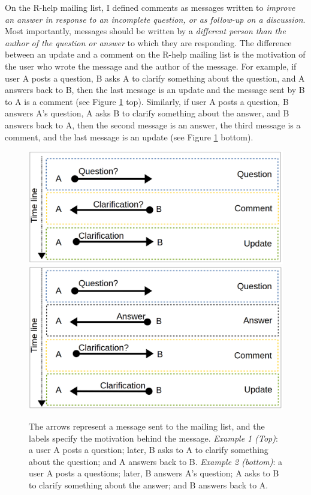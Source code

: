 \documentclass{sig-alternate-05-2015}
\begin{document}
	On the R-help mailing list, I defined comments as messages written to \emph{improve an answer in response to an incomplete question, or as follow-up on a discussion}.
	Most importantly, messages should be written by a \emph{different person than the author of the question or answer} to which they are responding.
	The difference between an update and a comment on the R-help mailing list is the motivation of the user who wrote the message and the author of the message.
	For example, if user A posts a question, B asks A to clarify something about the question, and A answers back to B, then the last message is an update and the message sent by B to A is a comment (see Figure \ref{fig:ExCommentUpdate1} top). 
	Similarly, if user A posts a question, B answers A's question, A asks B to clarify something about the answer, and B answers back to A, then the second message is an answer, the third message is a comment, and the last message is an update (see Figure \ref{fig:ExCommentUpdate1} bottom).

	\begin{figure}
		\centering
		\includegraphics[width=0.7\columnwidth]{Figures/ExCommentUpdate1}
		\includegraphics[width=0.7\columnwidth]{Figures/ExCommentUpdate2}
		\caption{The arrows represent a message sent to the mailing list, and the labels specify the motivation behind the message. \emph{Example 1 (Top)}: a user A posts a question; later, B asks to A to clarify something about the question; and A answers back to B. \emph{Example 2 (bottom)}: a user A posts a questions; later, B answers A's question; A asks to B to clarify something about the answer; and B answers back to A.}
		\label{fig:ExCommentUpdate1}
	\end{figure}
\end{document}
